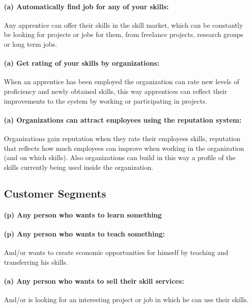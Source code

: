 \paragraph{(a) Automatically find job for any of your skills:} Any apprentice can offer their skills in the skill market, which can be constantly be looking for projects or jobs for them, from freelance projects, research groups or long term jobs.

\paragraph{(a) Get rating of your skills by organizations:} When an apprentice has been employed the organization can rate new levels of proficiency and newly obtained skills, this way apprentices can reflect their improvements to the system by working or participating in projects.

\paragraph{(a) Organizations can attract employees using the reputation system:} Organizations gain reputation when they rate their employees skills, reputation that reflects how much employees can improve when working in the organization (and on which skills). Also organizations can build in this way a profile of the skills currently being used inside the organization.


\subsection{Customer Segments}

\paragraph{(p) Any person who wants to learn something}

\paragraph{(p) Any person who wants to teach something:} And/or wants to create economic opportunities for himself by teaching and transferring his skills.

\paragraph{(a) Any person who wants to sell their skill services:} And/or is looking for an interesting project or job in which he can use their skills.

